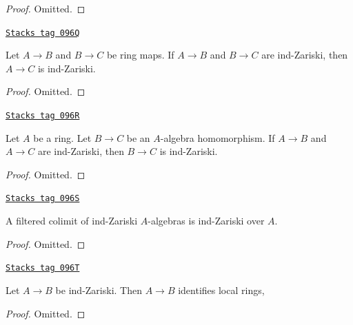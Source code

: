 \begin{proof}
Omitted.
\end{proof}

\begin{lemma}
\label{proetale-lemma-composition-ind-zariski}
\href{https://stacks.math.columbia.edu/tag/096Q}{\texttt{Stacks tag 096Q}}

Let $A \to B$ and $B \to C$ be ring maps. If $A \to B$ and $B \to C$
are ind-Zariski, then $A \to C$ is ind-Zariski.
\end{lemma}

\begin{proof}
Omitted.
\end{proof}

\begin{lemma}
\label{proetale-lemma-ind-zariski-permanence}
\href{https://stacks.math.columbia.edu/tag/096R}{\texttt{Stacks tag 096R}}

Let $A$ be a ring. Let $B \to C$ be an $A$-algebra homomorphism.
If $A \to B$ and $A \to C$ are ind-Zariski, then $B \to C$
is ind-Zariski.
\end{lemma}

\begin{proof}
Omitted.
\end{proof}

\begin{lemma}
\label{proetale-lemma-ind-ind-zariski}
\href{https://stacks.math.columbia.edu/tag/096S}{\texttt{Stacks tag 096S}}

A filtered colimit of ind-Zariski $A$-algebras is ind-Zariski over $A$.
\end{lemma}

\begin{proof}
Omitted.
\end{proof}

\begin{lemma}
\label{proetale-lemma-ind-zariski-implies}
\href{https://stacks.math.columbia.edu/tag/096T}{\texttt{Stacks tag 096T}}

Let $A \to B$ be ind-Zariski. Then $A \to B$ identifies local rings,
\end{lemma}

\begin{proof}
Omitted.
\end{proof}

